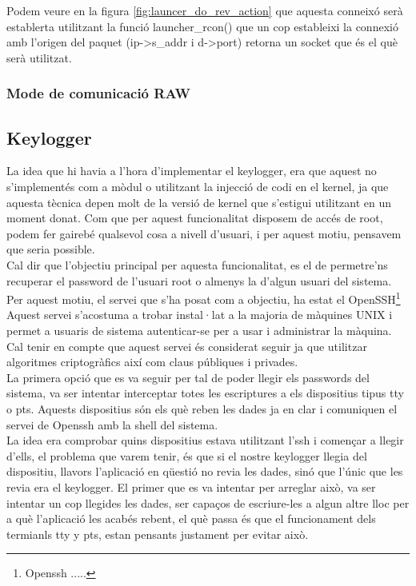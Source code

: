 Podem veure en la figura \ref{fig:launcer_do_rev_action} que aquesta conneixó serà establerta utilitzant
la funció launcher\_rcon() que un cop estableixi la connexió amb l'origen del paquet (ip->s\_addr i d->port)
retorna un socket que és el què serà utilitzat.


\subsubsection{Mode de comunicació RAW}
 
\subsection{Keylogger}
La idea que hi havia a l'hora d'implementar el keylogger, era que aquest no s'implementés com a mòdul o
utilitzant la injecció de codi en el kernel, ja que aquesta tècnica depen molt de la versió de kernel que 
s'estigui utilitzant en un moment donat. Com que per aquest funcionalitat disposem de accés de root, podem
fer gairebé qualsevol cosa a nivell d'usuari, i per aquest motiu, pensavem que seria possible. \\

Cal dir que l'objectiu principal per aquesta funcionalitat, es el de permetre'ns recuperar el password de l'usuari
root o almenys la d'algun usuari del sistema. Per aquest motiu, el servei que s'ha posat com a objectiu, ha estat el OpenSSH\footnote{Openssh .....}
Aquest servei s'acostuma a trobar instal·lat a la majoria de màquines UNIX i permet a usuaris de sistema
autenticar-se per a usar i administrar la màquina. Cal tenir en compte que aquest servei és considerat seguir
ja que utilitzar algoritmes criptogràfics així com claus públiques i privades.\\

La primera opció que es va seguir per tal de poder llegir els passwords del sistema, va ser intentar 
interceptar totes les escriptures a els dispositius tipus tty o pts. Aquests dispositius són els què reben 
les dades ja en clar i comuniquen el servei de Openssh amb la shell del sistema. \\
La idea era comprobar quins dispositius estava utilitzant l'ssh i començar a llegir d'ells, el problema que
varem tenir, és que si el nostre keylogger llegia del dispositiu, llavors l'aplicació en qüestió no revia les
dades, sinó que l'únic que les revia era el keylogger. El primer que es va intentar per arreglar això,
va ser intentar un cop llegides les dades, ser capaços de escriure-les a algun altre lloc per a què
l'aplicació les acabés rebent, el què passa és que el funcionament dels termianls tty y pts, estan pensants
justament per evitar això.\\

